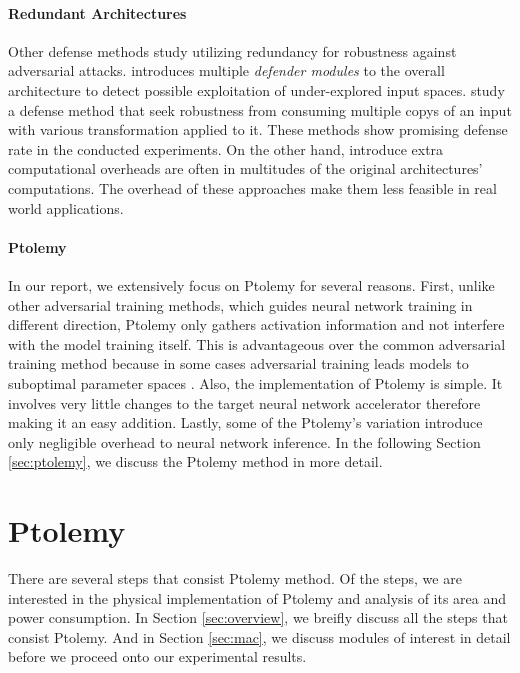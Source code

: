 \documentclass[11pt]{article}
\begin{document}
\paragraph{Redundant Architectures}

Other defense methods study utilizing redundancy for robustness against adversarial attacks. \citet{deepfense} introduces multiple \textit{defender modules} to the overall architecture to detect possible exploitation of under-explored input spaces. \citet{imagetransformation} study a defense method that seek robustness from consuming multiple copys of an input with various transformation applied to it. These methods show promising defense rate in the conducted experiments. On the other hand, introduce extra computational overheads are often in multitudes of the original architectures' computations. The overhead of these approaches make them less feasible in real world applications.

\paragraph{Ptolemy}

In our report, we extensively focus on Ptolemy \cite{ptolemy} for several reasons. First, unlike other adversarial training methods, which guides neural network training in different direction, Ptolemy only gathers activation  information and not interfere with the model training itself. This is advantageous over the common adversarial training method because in some cases adversarial training leads models to suboptimal parameter spaces \cite{onrecent}. Also, the implementation of Ptolemy is simple. It involves very little changes to the target neural network accelerator therefore making it an easy addition. Lastly, some of the Ptolemy's variation introduce only negligible overhead to neural network inference. In the following Section \ref{sec:ptolemy}, we discuss the Ptolemy method in more detail. 

\section{Ptolemy\label{sec:ptolemy}}

There are several steps that consist Ptolemy method. Of the steps, we are interested in the physical implementation of Ptolemy and analysis of its area and power consumption. In Section \ref{sec:overview}, we breifly discuss all the steps that consist Ptolemy. And in Section \ref{sec:mac}, we discuss modules of interest in detail before we proceed onto our experimental results.
\end{document}
